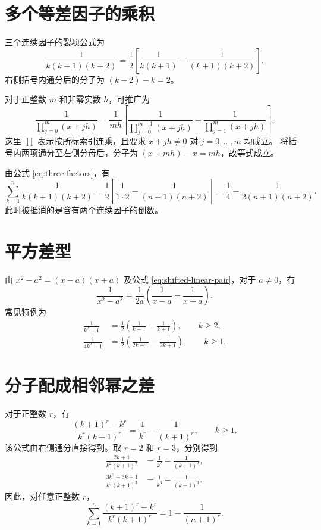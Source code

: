 \documentclass[UTF8]{ctexart}
\begin{document}
\section{多个等差因子的乘积}

三个连续因子的裂项公式为
\begin{equation}\label{eq:three-factors}
  \boxed{\frac1{k(k+1)(k+2)}
  =\frac12\left[\frac1{k(k+1)}-\frac1{(k+1)(k+2)}\right]}.
\end{equation}
右侧括号内通分后的分子为 $(k+2)-k=2$。

对于正整数 $m$ 和非零实数 $h$，可推广为
\begin{equation}\label{eq:arithmetic-factors}
  \boxed{
  \frac1{\displaystyle\prod_{j=0}^{m}(x+jh)}
  =\frac1{mh}\left[
  \frac1{\displaystyle\prod_{j=0}^{m-1}(x+jh)}
  -\frac1{\displaystyle\prod_{j=1}^{m}(x+jh)}
  \right]}.
\end{equation}
这里 $\prod$ 表示按所标索引连乘，且要求 $x+jh\ne0$ 对 $j=0,\ldots,m$ 均成立。
将括号内两项通分至左侧分母后，分子为 $(x+mh)-x=mh$，故等式成立。

\begin{example}[三个连续因子的求和]
由公式 \eqref{eq:three-factors}，有
\[
  \sum_{k=1}^{n}\frac1{k(k+1)(k+2)}
  =\frac12\left[\frac1{1\cdot2}-\frac1{(n+1)(n+2)}\right]
  =\frac14-\frac1{2(n+1)(n+2)}.
\]
此时被抵消的是含有两个连续因子的倒数。
\end{example}

\section{平方差型}

由 $x^2-a^2=(x-a)(x+a)$ 及公式 \eqref{eq:shifted-linear-pair}，对于 $a\ne0$，有
\begin{equation}\label{eq:difference-of-squares}
  \boxed{\frac1{x^2-a^2}
  =\frac1{2a}\left(\frac1{x-a}-\frac1{x+a}\right)}.
\end{equation}
常见特例为
\begin{align*}
  \frac1{k^2-1}
  &=\frac12\left(\frac1{k-1}-\frac1{k+1}\right),\qquad k\ge2,\\
  \frac1{4k^2-1}
  &=\frac12\left(\frac1{2k-1}-\frac1{2k+1}\right),\qquad k\ge1.
\end{align*}

\section{分子配成相邻幂之差}

对于正整数 $r$，有
\begin{equation}\label{eq:power-difference}
  \boxed{\frac{(k+1)^r-k^r}{k^r(k+1)^r}
  =\frac1{k^r}-\frac1{(k+1)^r}},\qquad k\ge1.
\end{equation}
该公式由右侧通分直接得到。取 $r=2$ 和 $r=3$，分别得到
\begin{align*}
  \frac{2k+1}{k^2(k+1)^2}
  &=\frac1{k^2}-\frac1{(k+1)^2},\\
  \frac{3k^2+3k+1}{k^3(k+1)^3}
  &=\frac1{k^3}-\frac1{(k+1)^3}.
\end{align*}
因此，对任意正整数 $r$，
\[
  \sum_{k=1}^{n}\frac{(k+1)^r-k^r}{k^r(k+1)^r}
  =1-\frac1{(n+1)^r}.
\]
\end{document}
